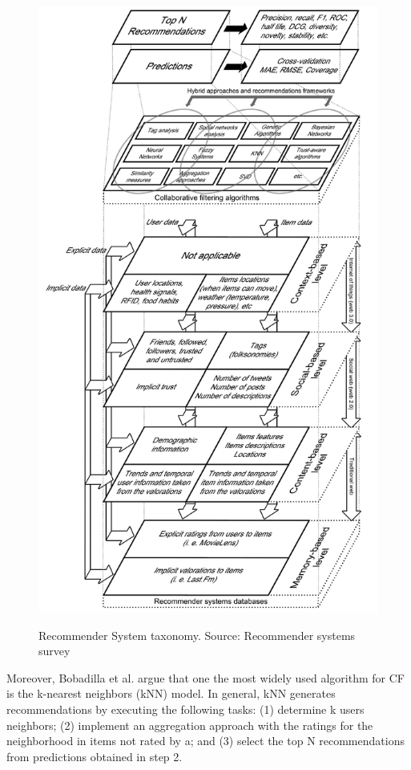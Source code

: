 \begin{figure}[h]
\centering
\caption[Recommender Systems taxonomy]{Recommender System taxonomy. Source: Recommender systems survey\cite{bobadilla2013recommender}}
\includegraphics[scale=0.8]{images/taxonomyrs}
\label{fig:taxonomy}
\end{figure}

Moreover, Bobadilla et al. argue that one the most widely used algorithm for CF is the k-nearest neighbors (kNN) model. In general, kNN generates recommendations by executing the following tasks: (1) determine k users neighbors; (2) implement an aggregation approach with the ratings for the neighborhood in items not rated by a; and (3) select the top N recommendations from predictions obtained in step 2.

